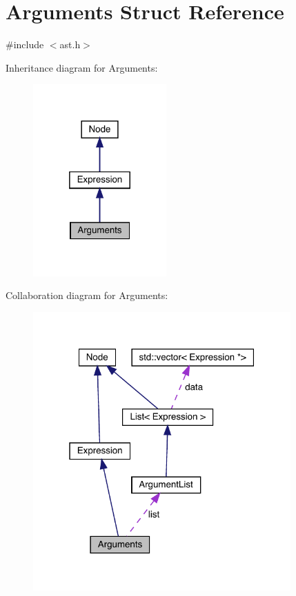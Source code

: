 \hypertarget{struct_arguments}{}\section{Arguments Struct Reference}
\label{struct_arguments}


{\ttfamily \#include $<$ast.\+h$>$}



Inheritance diagram for Arguments\+:
\nopagebreak
\begin{figure}[H]
\begin{center}
\leavevmode
\includegraphics[width=145pt]{struct_arguments__inherit__graph}
\end{center}
\end{figure}


Collaboration diagram for Arguments\+:
\nopagebreak
\begin{figure}[H]
\begin{center}
\leavevmode
\includegraphics[width=280pt]{struct_arguments__coll__graph}
\end{center}
\end{figure}
